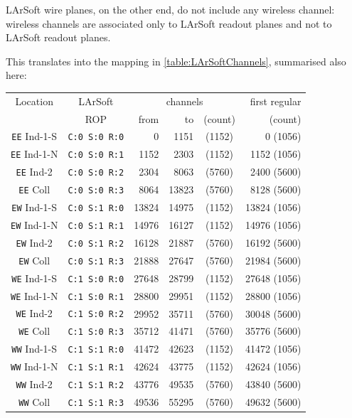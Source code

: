 LArSoft wire planes, on the other end, do not include any wireless channel:
wireless channels are associated only to LArSoft readout planes
and not to LArSoft readout planes.

This translates into the mapping in \cref{table:LArSoftChannels}, summarised also here:
\begin{center}
  \begin{tabular}{|cc|rrc|r|}
    \hline
    \hline
    Location            & LArSoft              & \multicolumn{3}{c|}{channels}
                                                                         & first regular \\
                        & ROP                  &  from &    to & (count) &       (count) \\
    \hline
    \texttt{EE} Ind-1-S & \texttt{C:0 S:0 R:0} &     0 &  1151 &  (1152) &      0 (1056) \\
    \texttt{EE} Ind-1-N & \texttt{C:0 S:0 R:1} &  1152 &  2303 &  (1152) &   1152 (1056) \\
    \texttt{EE} Ind-2   & \texttt{C:0 S:0 R:2} &  2304 &  8063 &  (5760) &   2400 (5600) \\
    \texttt{EE} Coll    & \texttt{C:0 S:0 R:3} &  8064 & 13823 &  (5760) &   8128 (5600) \\
    \hline
    \texttt{EW} Ind-1-S & \texttt{C:0 S:1 R:0} & 13824 & 14975 &  (1152) &  13824 (1056) \\
    \texttt{EW} Ind-1-N & \texttt{C:0 S:1 R:1} & 14976 & 16127 &  (1152) &  14976 (1056) \\
    \texttt{EW} Ind-2   & \texttt{C:0 S:1 R:2} & 16128 & 21887 &  (5760) &  16192 (5600) \\
    \texttt{EW} Coll    & \texttt{C:0 S:1 R:3} & 21888 & 27647 &  (5760) &  21984 (5600) \\
    \hline
    \hline
    \texttt{WE} Ind-1-S & \texttt{C:1 S:0 R:0} & 27648 & 28799 &  (1152) &  27648 (1056) \\
    \texttt{WE} Ind-1-N & \texttt{C:1 S:0 R:1} & 28800 & 29951 &  (1152) &  28800 (1056) \\
    \texttt{WE} Ind-2   & \texttt{C:1 S:0 R:2} & 29952 & 35711 &  (5760) &  30048 (5600) \\
    \texttt{WE} Coll    & \texttt{C:1 S:0 R:3} & 35712 & 41471 &  (5760) &  35776 (5600) \\
    \hline
    \texttt{WW} Ind-1-S & \texttt{C:1 S:1 R:0} & 41472 & 42623 &  (1152) &  41472 (1056) \\
    \texttt{WW} Ind-1-N & \texttt{C:1 S:1 R:1} & 42624 & 43775 &  (1152) &  42624 (1056) \\
    \texttt{WW} Ind-2   & \texttt{C:1 S:1 R:2} & 43776 & 49535 &  (5760) &  43840 (5600) \\
    \texttt{WW} Coll    & \texttt{C:1 S:1 R:3} & 49536 & 55295 &  (5760) &  49632 (5600) \\
    \hline
    \hline
  \end{tabular}
  \label{tab:LArSoftChannelsReduced}
\end{center}

